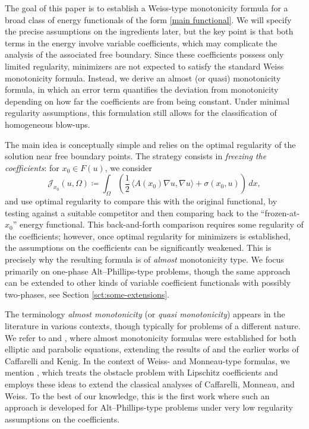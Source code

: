 \documentclass[reqno,11pt]{amsart}
\newcommand{\1}{\mathds{1}}  %
\numberwithin{equation}{section}
\begin{document}
The goal of this paper is to establish a Weiss-type monotonicity formula for a broad class of energy functionals of the form \eqref{main functional}. We will specify the precise assumptions on the ingredients later, but the key point is that both terms in the energy involve variable coefficients, which may complicate the analysis of the associated free boundary. Since these coefficients possess only limited regularity, minimizers are not expected to satisfy the standard Weiss monotonicity formula. Instead, we derive an almost (or quasi) monotonicity formula, in which an error term quantifies the deviation from monotonicity depending on how far the coefficients are from being constant. Under minimal regularity assumptions, this formulation still allows for the classification of homogeneous blow-ups.

The main idea is conceptually simple and relies on the optimal regularity of the solution near free boundary points. The strategy consists in \emph{freezing the coefficients}: for $x_0 \in F(u)$, we consider
\[
    \mathcal{J}_{x_0}(u,\Omega) \coloneqq \int_\Omega \left( \frac{1}{2} \, \langle A(x_0)\nabla u, \nabla u \rangle + \sigma(x_0,u) \right)\,dx,
\]
and use optimal regularity to compare this with the original functional, by testing against a suitable competitor and then comparing back to the ``frozen-at-$x_0$'' energy functional. This back-and-forth comparison requires some regularity of the coefficients; however, once optimal regularity for minimizers is established, the assumptions on the coefficients can be significantly weakened. This is precisely why the resulting formula is of \emph{almost} monotonicity type. We focus primarily on one-phase Alt--Phillips-type problems, though the same approach can be extended to other kinds of variable coefficient functionals with possibly two-phases, see Section \ref{sct:some-extensions}.

The terminology \emph{almost monotonicity} (or \emph{quasi monotonicity}) appears in the literature in various contexts, though typically for problems of a different nature. We refer to \cite{EP} and \cite{MP}, where almost monotonicity formulas were established for both elliptic and parabolic equations, extending the results of \cite{CJK} and the earlier works of Caffarelli and Kenig. In the context of Weiss- and Monneau-type formulas, we mention \cite{FGS}, which treats the obstacle problem with Lipschitz coefficients and employs these ideas to extend the classical analyses of Caffarelli, Monneau, and Weiss. To the best of our knowledge, this is the first work where such an approach is developed for Alt--Phillips-type problems under very low regularity assumptions on the coefficients.
\end{document}
